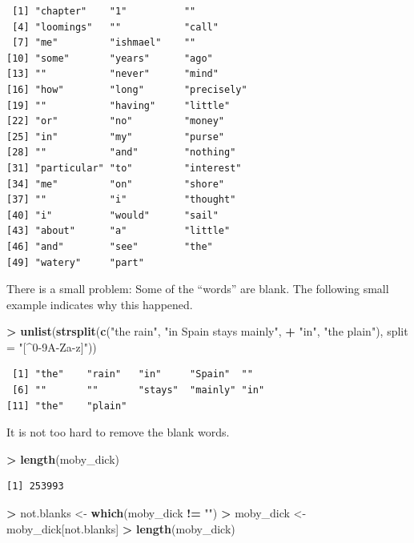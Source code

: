 \documentclass[]{krantz}
\makeatletter
\newenvironment{Shaded}{\begin{snugshade}}{\end{snugshade}}
\newcommand{\DataTypeTok}[1]{\textcolor[rgb]{0.27,0.27,0.27}{#1}}
\newcommand{\KeywordTok}[1]{\textcolor[rgb]{0.27,0.27,0.27}{\textbf{#1}}}
\newcommand{\NormalTok}[1]{#1}
\newcommand{\OperatorTok}[1]{\textcolor[rgb]{0.43,0.43,0.43}{\textbf{#1}}}
\newcommand{\StringTok}[1]{\textcolor[rgb]{0.5,0.5,0.5}{#1}}
\newenvironment{kframe}{%
\medskip{}
\setlength{\fboxsep}{.8em}
 \def\at@end@of@kframe{}%
 \ifinner\ifhmode%
  \def\at@end@of@kframe{\end{minipage}}%
  \begin{minipage}{\columnwidth}%
 \fi\fi%
 \def\FrameCommand##1{\hskip\@totalleftmargin \hskip-\fboxsep
 \colorbox{shadecolor}{##1}\hskip-\fboxsep
     \hskip-\linewidth \hskip-\@totalleftmargin \hskip\columnwidth}%
 \MakeFramed {\advance\hsize-\width
   \@totalleftmargin\z@ \linewidth\hsize
   \@setminipage}}%
 {\par\unskip\endMakeFramed%
 \at@end@of@kframe}
\renewenvironment{Shaded}{\begin{kframe}}{\end{kframe}}
\makeatother
\begin{document}
\begin{verbatim}
 [1] "chapter"    "1"          ""          
 [4] "loomings"   ""           "call"      
 [7] "me"         "ishmael"    ""          
[10] "some"       "years"      "ago"       
[13] ""           "never"      "mind"      
[16] "how"        "long"       "precisely" 
[19] ""           "having"     "little"    
[22] "or"         "no"         "money"     
[25] "in"         "my"         "purse"     
[28] ""           "and"        "nothing"   
[31] "particular" "to"         "interest"  
[34] "me"         "on"         "shore"     
[37] ""           "i"          "thought"   
[40] "i"          "would"      "sail"      
[43] "about"      "a"          "little"    
[46] "and"        "see"        "the"       
[49] "watery"     "part"      
\end{verbatim}

There is a small problem: Some of the ``words'' are blank. The following small example indicates why this happened.

\begin{Shaded}
\begin{Highlighting}[]
\OperatorTok{>}\StringTok{ }\KeywordTok{unlist}\NormalTok{(}\KeywordTok{strsplit}\NormalTok{(}\KeywordTok{c}\NormalTok{(}\StringTok{"the rain"}\NormalTok{, }\StringTok{"in Spain    stays mainly"}\NormalTok{, }
\OperatorTok{+}\StringTok{   "in"}\NormalTok{, }\StringTok{"the plain"}\NormalTok{), }\DataTypeTok{split =} \StringTok{"[^0-9A-Za-z]"}\NormalTok{))}
\end{Highlighting}
\end{Shaded}

\begin{verbatim}
 [1] "the"    "rain"   "in"     "Spain"  ""      
 [6] ""       ""       "stays"  "mainly" "in"    
[11] "the"    "plain" 
\end{verbatim}

It is not too hard to remove the blank words.

\begin{Shaded}
\begin{Highlighting}[]
\OperatorTok{>}\StringTok{ }\KeywordTok{length}\NormalTok{(moby_dick)}
\end{Highlighting}
\end{Shaded}

\begin{verbatim}
[1] 253993
\end{verbatim}

\begin{Shaded}
\begin{Highlighting}[]
\OperatorTok{>}\StringTok{ }\NormalTok{not.blanks <-}\StringTok{ }\KeywordTok{which}\NormalTok{(moby_dick }\OperatorTok{!=}\StringTok{ ""}\NormalTok{)}
\OperatorTok{>}\StringTok{ }\NormalTok{moby_dick <-}\StringTok{ }\NormalTok{moby_dick[not.blanks]}
\OperatorTok{>}\StringTok{ }\KeywordTok{length}\NormalTok{(moby_dick)}
\end{Highlighting}
\end{Shaded}
\end{document}
